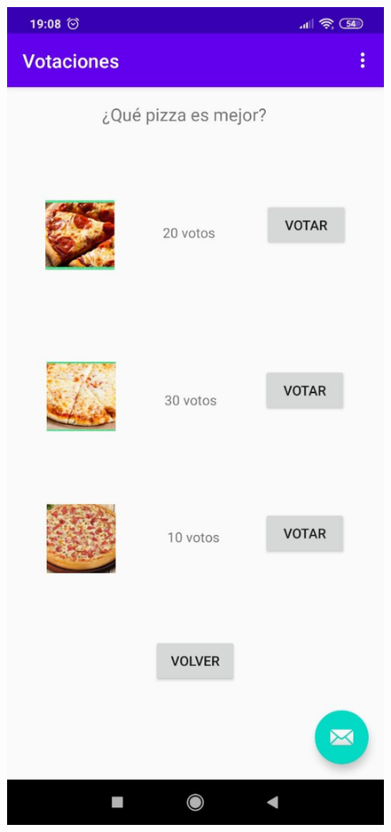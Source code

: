 \documentclass{article}
\begin{document}
 \begin{figure}[H]
 	\centering
 	\includegraphics[totalheight=8cm]{img/android7}
 \end{figure}
\end{document}
